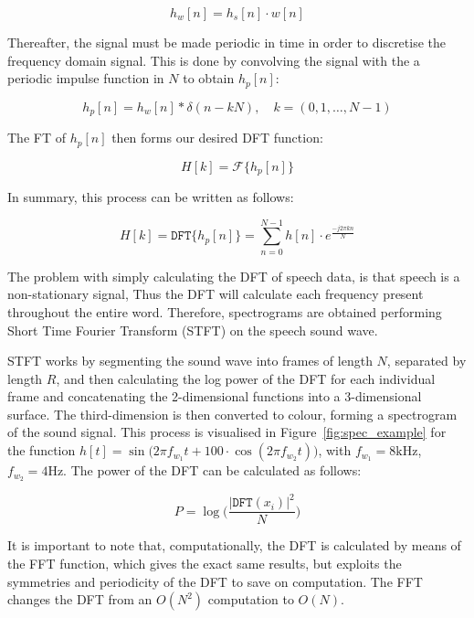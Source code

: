 \begin{equation}
    h_{w}[n] = h_{s}[n] \cdot w[n]
\end{equation}

Thereafter, the signal must be made periodic in time in order to discretise the frequency domain signal. 
This is done by convolving the signal with the a periodic impulse function in $N$ to obtain $h_{p}[n]$:

\begin{equation}
    h_{p}[n] = h_{w}[n] \ast \delta(n-kN), \quad k=(0,1,\dotsc,N-1)
\end{equation}

The FT of $h_{p}[n]$ then forms our desired DFT function:

\begin{equation}
    H[k] = \mathcal{F} \{ h_{p}[n] \}
\end{equation}

In summary, this process can be written as follows:

\begin{equation}
    H[k] = \mathtt{DFT} \{ h_{p}[n] \} = \displaystyle\sum_{n=0}^{N-1} h[n] \cdot e^{\displaystyle\frac{-j2\pi kn}{N}}
\end{equation}

The problem with simply calculating the DFT of speech data, is that speech is a non-stationary signal, Thus the DFT will calculate each frequency present throughout the entire word. 
Therefore, spectrograms are obtained performing Short Time Fourier Transform (STFT) on the speech sound wave. 

STFT works by segmenting the sound wave into frames of length $N$, separated by length $R$, and then calculating the log power of the DFT for each individual frame and concatenating the 2-dimensional functions into a 3-dimensional surface. 
The third-dimension is then converted to colour, forming a spectrogram of the sound signal. 
This process is visualised in Figure~\ref{fig:spec_example} for the function $h[t]=\sin\big(2\pi f_{w_1} t + 100 \cdot \cos(2\pi f_{w_2} t) \big)$, with $f_{w_1}= 8 \mathrm{kHz}$, $f_{w_2}= 4 \mathrm{Hz}$.
The power of the DFT can be calculated as follows:

\begin{equation}
    P = \log\bigg(\frac{|\mathtt{DFT}(x_i)|^2}{N}\bigg)
\end{equation}

It is important to note that, computationally, the DFT is calculated by means of the FFT function, which gives the exact same results, but exploits the symmetries and periodicity of the DFT to save on computation. 
The FFT changes the DFT from an $O(N^2)$ computation to $O(N)$.

